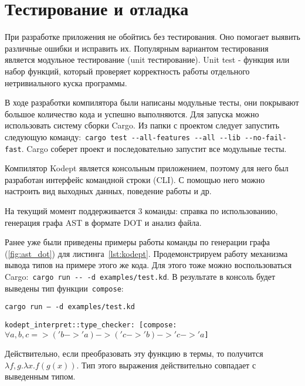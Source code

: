 \chapter{Тестирование и отладка}
\label{ch:chap4_soft_testing}

При разработке приложения не обойтись без тестирования.
Оно помогает выявить различные ошибки и исправить их.
Популярным вариантом тестирования является модульное тестирование (unit тестирование).
Unit test - функция или набор функций, который проверяет корректность работы отдельного нетривиального куска программы.

В ходе разработки компилятора были написаны модульные тесты, они покрывают большое количество кода и успешно выполняются.
Для запуска можно использовать систему сборки Cargo.
Из папки с проектом следует запустить следующую команду:~\lstinline{cargo test --all-features --all --lib --no-fail-fast}.
Cargo соберет проект и последовательно запустит все модульные тесты.

Компилятор Kodept является консольным приложением, поэтому для него был разработан интерфейс командной строки (CLI).
С помощью него можно настроить вид выходных данных, поведение работы и др.

На текущий момент поддерживается 3 команды: справка по использованию, генерация графа AST в формате DOT и анализ файла.

Ранее уже были приведены примеры работы команды по генерации графа (\ref{fig:ast_dot}) для листинга~\ref{lst:kodept}.
Продемонстрируем работу механизма вывода типов на примере этого же кода.
Для этого тоже можно воспользоваться Cargo:~\lstinline{cargo run -- -d examples/test.kd}.
В результате в консоль будет выведены тип функции~\lstinline{compose}:

\texttt{cargo run -- -d examples/test.kd}

\texttt{kodept\_interpret::type\_checker: [compose: $\forall a, b, c => ('b -> 'a) -> ('c -> 'b) -> 'c -> 'a$]}

Действительно, если преобразовать эту функцию в термы, то получится $\lambda f, g. \lambda x. f(g(x))$.
Тип этого выражения действительно совпадает с выведенным типом.


